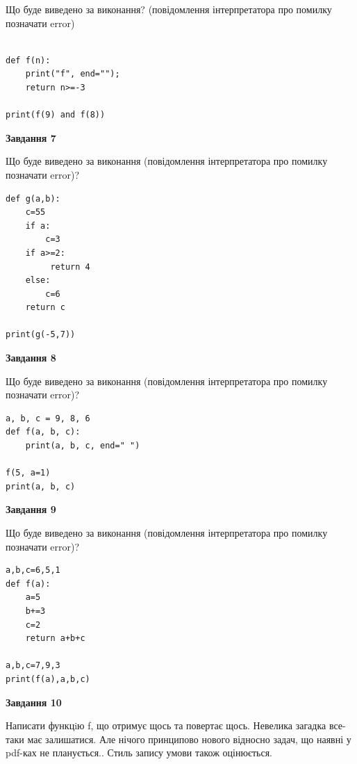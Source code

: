 \documentclass[12pt, ukrainian]{article}
\begin{document}
{\begin {large}
Що буде виведено за виконання? (повідомлення інтерпретатора про помилку позначати error)\par
\begin{verbatim}

def f(n):
    print("f", end="");
    return n>=-3

print(f(9) and f(8))
\end{verbatim}

{\begin {center}\textbf{Завдання 7}\end {center}}

Що буде виведено за виконання (повідомлення інтерпретатора про помилку позначати error)?\par
\begin{verbatim}
def g(a,b):
    c=55
    if a:
        c=3
    if a>=2:
         return 4
    else: 
        c=6
    return c

print(g(-5,7))
\end{verbatim}

{\begin {center}\textbf{Завдання 8}\end {center}}

Що буде виведено за виконання (повідомлення інтерпретатора про помилку позначати error)?\par
\begin{verbatim}
a, b, c = 9, 8, 6
def f(a, b, c):
    print(a, b, c, end=" ")

f(5, a=1)
print(a, b, c)
\end{verbatim}

{\begin {center}\textbf{Завдання 9}\end {center}}

Що буде виведено за виконання (повідомлення інтерпретатора про помилку позначати error)?\par
\begin{verbatim}
a,b,c=6,5,1
def f(a):
    a=5
    b+=3
    c=2
    return a+b+c

a,b,c=7,9,3
print(f(a),a,b,c)
\end{verbatim}

{\begin {center}\textbf{Завдання 10}\end {center}}


Написати функцiю f, що отримує щось та повертає щось. Невелика загадка все-таки має залишатися. Але нічого принципово нового відносно задач, що наявні у pdf-ках не планується.. Стиль запису умови також оцінюється.\par
\end {large}}
\newpage
\end{document}
